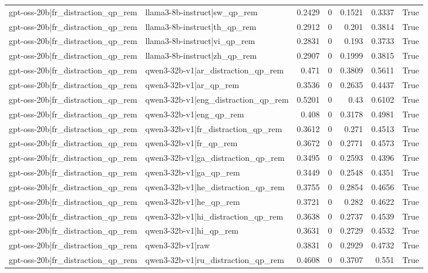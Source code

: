 \begin{table}
\begin{tabular}{l l r r r r l}
gpt-oss-20b|fr_distraction_qp_rem & llama3-8b-instruct|sw_qp_rem & 0.2429 & 0 & 0.1521 & 0.3337 & True \\
gpt-oss-20b|fr_distraction_qp_rem & llama3-8b-instruct|th_qp_rem & 0.2912 & 0 & 0.201 & 0.3814 & True \\
gpt-oss-20b|fr_distraction_qp_rem & llama3-8b-instruct|vi_qp_rem & 0.2831 & 0 & 0.193 & 0.3733 & True \\
gpt-oss-20b|fr_distraction_qp_rem & llama3-8b-instruct|zh_qp_rem & 0.2907 & 0 & 0.1999 & 0.3815 & True \\
gpt-oss-20b|fr_distraction_qp_rem & qwen3-32b-v1|ar_distraction_qp_rem & 0.471 & 0 & 0.3809 & 0.5611 & True \\
gpt-oss-20b|fr_distraction_qp_rem & qwen3-32b-v1|ar_qp_rem & 0.3536 & 0 & 0.2635 & 0.4437 & True \\
gpt-oss-20b|fr_distraction_qp_rem & qwen3-32b-v1|eng_distraction_qp_rem & 0.5201 & 0 & 0.43 & 0.6102 & True \\
gpt-oss-20b|fr_distraction_qp_rem & qwen3-32b-v1|eng_qp_rem & 0.408 & 0 & 0.3178 & 0.4981 & True \\
gpt-oss-20b|fr_distraction_qp_rem & qwen3-32b-v1|fr_distraction_qp_rem & 0.3612 & 0 & 0.271 & 0.4513 & True \\
gpt-oss-20b|fr_distraction_qp_rem & qwen3-32b-v1|fr_qp_rem & 0.3672 & 0 & 0.2771 & 0.4573 & True \\
gpt-oss-20b|fr_distraction_qp_rem & qwen3-32b-v1|ga_distraction_qp_rem & 0.3495 & 0 & 0.2593 & 0.4396 & True \\
gpt-oss-20b|fr_distraction_qp_rem & qwen3-32b-v1|ga_qp_rem & 0.3449 & 0 & 0.2548 & 0.4351 & True \\
gpt-oss-20b|fr_distraction_qp_rem & qwen3-32b-v1|he_distraction_qp_rem & 0.3755 & 0 & 0.2854 & 0.4656 & True \\
gpt-oss-20b|fr_distraction_qp_rem & qwen3-32b-v1|he_qp_rem & 0.3721 & 0 & 0.282 & 0.4622 & True \\
gpt-oss-20b|fr_distraction_qp_rem & qwen3-32b-v1|hi_distraction_qp_rem & 0.3638 & 0 & 0.2737 & 0.4539 & True \\
gpt-oss-20b|fr_distraction_qp_rem & qwen3-32b-v1|hi_qp_rem & 0.3631 & 0 & 0.2729 & 0.4532 & True \\
gpt-oss-20b|fr_distraction_qp_rem & qwen3-32b-v1|raw & 0.3831 & 0 & 0.2929 & 0.4732 & True \\
gpt-oss-20b|fr_distraction_qp_rem & qwen3-32b-v1|ru_distraction_qp_rem & 0.4608 & 0 & 0.3707 & 0.551 & True \\

\end{tabular}
\end{table}

